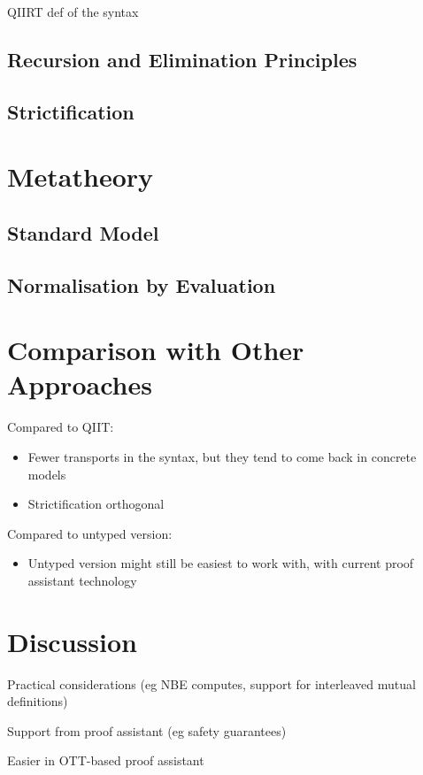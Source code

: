 \documentclass[sigplan,10pt,anonymous,review]{acmart}\settopmatter{printfolios=true,printccs=false,printacmref=false}
\begin{document}
QIIRT def of the syntax

\subsection{Recursion and Elimination Principles}

\subsection{Strictification}

\section{Metatheory}

\subsection{Standard Model}


\subsection{Normalisation by Evaluation}


\section{Comparison with Other Approaches}

Compared to QIIT:

\begin{itemize}
\item Fewer transports in the syntax, but they tend to come back in concrete models
\item Strictification orthogonal
\end{itemize}

Compared to untyped version:
\begin{itemize}
\item Untyped version might still be easiest to work with, with current proof assistant technology
\end{itemize}

\section{Discussion}

Practical considerations (eg NBE computes, support for interleaved mutual definitions)

Support from proof assistant (eg safety guarantees)

Easier in OTT-based proof assistant
\end{document}
